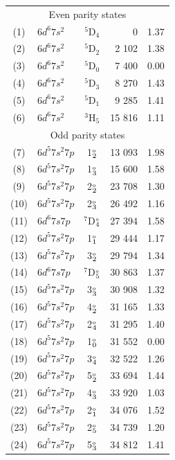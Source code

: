 \documentclass[10pt,a4paper, twoside, openright]{report}
\begin{document}
{\begin{longtable}{cl@{\hspace{0.5cm}}c@{\hspace{0.5cm}}r@{\hspace{0.5cm}}r}
 		\midrule 
  		 	\multicolumn{5}{c}{Even parity states}\\
 (1) &  $6d^6 7s^2$  &  $^5$D$_{4}$   & 0 & 1.37   \\ 
 (2) & $6d^6 7s^2$  &  $^5$D$_2$   & 2 102 & 1.38   \\  
 (3) &  $6d^6 7s^2$  &  $^5$D$_{0}$ & 7 400 & 0.00   \\ 
 (4) &  $6d^6 7s^2$  &  $^5$D$_{3}$ & 8 270 & 1.43   \\ 
 (5) &   $6d^6 7s^2$  &  $^5$D$_1$   & 9 285 & 1.41   \\ 
 (6) &    $6d^6 7s^2$  &  $^3$H$_{5}$ & 15 816 & 1.11\\ 
\multicolumn{5}{c}{Odd parity states}\\
  (7) &   $6d^5 7s^2 7p$  & 1$_2^{\rm_o}$    & 13 093 & 1.98  \\  
  (8) &  $6d^5 7s^2 7p$  & 1$_3^{\rm_o}$     & 15 600 & 1.58  \\ 
 (9) &  $6d^5 7s^2 7p$  & 2$_2^{\rm_o}$  & 23 708 & 1.30  \\ 
 (10) &  $6d^5 7s^2 7p$  & 2$_3^{\rm_o}$     & 26 492 & 1.16  \\ 
(11) &   $6d^6 7s 7p$  &  $^7$D$_{4}^{\rm_o}$   & 27 394 & 1.58  \\  
(12) &   $6d^5 7s^2 7p$  &  1$_1^{\rm_o}$   & 29 444 & 1.17  \\  
(13) &    $6d^5 7s^2 7p$  &  3$_2^{\rm_o}$    & 29 794 & 1.34  \\ 
(14) &   $6d^6 7s 7p$  &  $^7$D$_5^{\rm_o}$    &30 863 & 1.37   \\  
(15) &  $6d^5 7s^2 7p$  & 3$_3^{\rm_o}$     & 30 908 & 1.32  \\ 
(16) &   $6d^5 7s^2 7p$  & 4$_2^{\rm_o}$    & 31 165 & 1.33 \\ 
(17) &   $6d^5 7s^2 7p$  & 2$_4^{\rm_o}$      & 31 295 & 1.40   \\  
(18) &  $6d^5 7s^2 7p$  & 1$_0^{\rm_o}$  & 31 552 & 0.00  \\ 
(19) &  $6d^5 7s^2 7p$ & 3$_4^{\rm_o}$     & 32 522 & 1.26  \\ 
(20) &  $6d^5 7s^2 7p$ & 5$_2^{\rm_o}$   & 33 694 & 1.44  \\ 
(21) &  $6d^5 7s^2 7p$ & 4$_3^{\rm_o}$     & 33 920 & 1.03 \\ 
(22) &  $6d^5 7s^2 7p$ & 2$_1^{\rm_o}$      & 34 076 & 1.52 \\ 
(23) &  $6d^5 7s^2 7p$  & 2$_5^{\rm_o}$     & 34 739 & 1.20 \\ 
(24) &  $6d^5 7s^2 7p$ & 5$_3^{\rm_o}$   & 34 812 & 1.41 \\

\end{longtable}}
\end{document}
